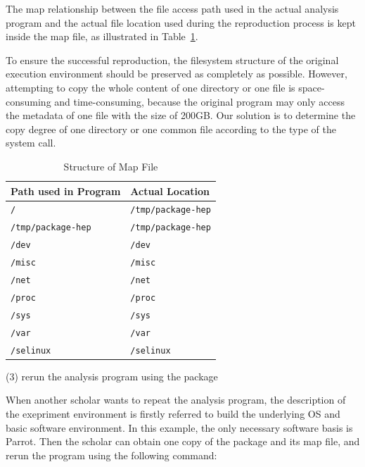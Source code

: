 \documentclass{acm_proc_article-sp}
\begin{document}
The map relationship between the file access path used in the actual analysis
program and the actual file location used during the reproduction process is
kept inside the map file, as illustrated in Table~\ref{table:map-file}.

To ensure the successful reproduction, the filesystem structure of the original
execution environment should be preserved as completely as possible. However,
attempting to copy the whole content of one directory or one file is
space-consuming and time-consuming, because the original program may only
access the metadata of one file with the size of 200GB. Our solution is to
determine the copy degree of one directory or one common file according to the
type of the system call.


\begin{table}
    \centering
    \begin{tabular}{|l|l|}
    \hline
    Path used in Program & Actual Location \\ \hline
    {\tt /} & {\tt /tmp/package-hep} \\ \hline
    {\tt /tmp/package-hep} & {\tt /tmp/package-hep} \\ \hline
    {\tt /dev} & {\tt /dev} \\ \hline
    {\tt /misc} & {\tt /misc}\\ \hline
    {\tt /net} & {\tt /net}\\ \hline
    {\tt /proc} & {\tt /proc}\\ \hline
    {\tt /sys} & {\tt /sys}\\ \hline
    {\tt /var} & {\tt /var}\\ \hline
    {\tt /selinux} & {\tt /selinux}\\ \hline
    \end{tabular}
    \caption{Structure of Map File}
    \label{table:map-file}
\end{table}

(3) rerun the analysis program using the package

When another scholar wants to repeat the analysis program, 
the description of the exepriment environment is firstly referred to build the underlying OS and basic software environment. In this example, the only necessary software basis is Parrot. Then the scholar can obtain one copy of the package and its map file, and rerun the program using the following command:
\end{document}

